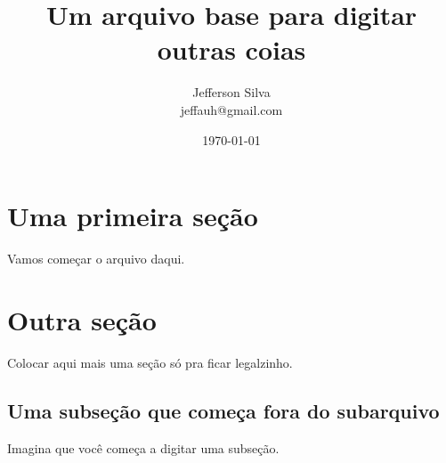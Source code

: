 \documentclass[11p, %
			   openany, %
			   twoside, %
			   brazil %
			   ]{article}
\title{Um arquivo base para digitar outras coias}   	%
\author{Jefferson Silva \\								%
		\small{jeffauh@gmail.com}
		}
\date{\today}											%
\theoremstyle{thm}							%
\theoremstyle{definicao}
\begin{document}
	
\maketitle						%

\frenchspacing					%
\onehalfspacing					%

\section{Uma primeira seção}

Vamos começar o arquivo daqui.



\section{Outra seção}

Colocar aqui mais uma seção só pra ficar legalzinho.

\subsection{Uma subseção que começa fora do subarquivo}

Imagina que você começa a digitar uma subseção. 


\nocite{*}						  %
\end{document}
